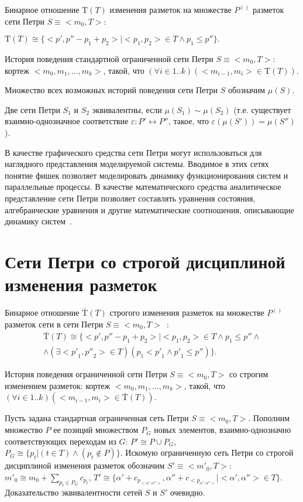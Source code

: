 Бинарное отношение $\mathrm{T}(T)$ изменения разметок на множестве $P^{()}$ разметок сети Петри $S\equiv < m_0, T >$:
\begin{center}
	$\mathrm{T}(T)\cong\{<p',p''-p_1+p_2>|<p_1,p_2> \in T \wedge p_1\leq p''\}.$
\end{center}

История поведения стандартной ограниченной сети Петри $S\equiv < m_0, T >$: кортеж $<m_0,m_1,...,m_k>$, 
такой, что $(\forall i \in 1..k)(<m_{i-1}, m_i> \in \mathrm{T}(T))$.

Множество всех возможных историй поведения сети Петри $S$ обозначим $\mu(S)$.

Две сети Петри $S_1$ и $S_2$ эквивалентны, если $\mu(S_1) \sim \mu(S_2)$ (т.е. существует взаимно-однозначное соответствие $\varepsilon:P'\leftrightarrow P''$, такое, что $\varepsilon(\mu(S')) = \mu(S'')$).


В качестве графического средства сети Петри могут использоваться для наглядного представления моделируемой системы. 
Вводимое в этих сетях понятие фишек позволяет моделировать динамику функционирования систем и параллельные процессы. 
В качестве математического средства аналитическое представление сети Петри позволяет составлять уравнения состояния, алгебраические уравнения и другие математические соотношения, описывающие динамику систем~\cite{radioElect}.

\section{Сети Петри со строгой дисциплиной изменения разметок}
Бинарное отношение $\bar{\mathrm{T}}(T)$ строгого изменения разметок на множестве $P^{()}$ 
разметок сети в сети Петри $S\equiv < m_0, T >$~\cite{falkTheory}:
\begin{equation}
\begin{multlined}
\bar{\mathrm{T}}(T)\cong\{<p',p''-p_1+p_2>|<p_1,p_2> \in T \wedge p_1\leq p'' \wedge\\
\wedge (\exists<{p'}_1, {p''}_2> \in T)(p_1 < {p'}_1 \wedge {p'}_1 \leq p'') \}.
\end{multlined}
\end{equation}

История поведения ограниченной сети Петри $S\equiv < m_0, T >$ со строгим изменением разметок: кортеж  $<m_0, m_1, ..., m_k>$, 
такой, что\\ $(\forall i \in 1..k)(<m_{i-1}, m_i> \in \bar{\mathrm{T}}(T))$.

Пусть задана стандартная ограниченная сеть Петри $S\equiv < m_0, T >$. Пополним множество $P$ ее позиций множеством $P_G$ новых элементов,
взаимно-однозначно соответствующих переходам из $G$: $P'\cong P\cup P_G$,\\ 
$P_G\cong \{p_t|(t\in T)\wedge (p_t \notin P)\}$. Искомую ограниченную сеть Петри со строгой дисциплиной изменения разметок 
обозначим $S'\equiv  < {m'}_0, T >$:\\
${m'}_0\cong m_0 +\displaystyle\sum_{p_t\in P_G}c_{p_t}$,
$T'\cong\{\alpha'+c_{p_{<\alpha', \alpha''>}}, \alpha'' +c_{<p_{\alpha', \alpha''>}}|<\alpha', \alpha''> \in T\} $.
Доказательство эквивалентности сетей $S$ и $S'$ очевидно.
